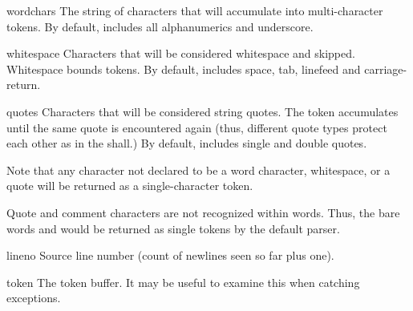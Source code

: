 \begin{memberdesc}{wordchars}
The string of characters that will accumulate into multi-character
tokens. By default, includes all \ASCII{} alphanumerics and
underscore.
\end{memberdesc}

\begin{memberdesc}{whitespace}
Characters that will be considered whitespace and skipped.  Whitespace
bounds tokens.  By default, includes space, tab, linefeed and
carriage-return.
\end{memberdesc}

\begin{memberdesc}{quotes}
Characters that will be considered string quotes.  The token
accumulates until the same quote is encountered again (thus, different
quote types protect each other as in the shall.)  By default, includes
\ASCII{} single and double quotes.
\end{memberdesc}

Note that any character not declared to be a word character,
whitespace, or a quote will be returned as a single-character token.

Quote and comment characters are not recognized within words.  Thus,
the bare words  and  would be returned as single
tokens by the default parser.

\begin{memberdesc}{lineno}
Source line number (count of newlines seen so far plus one).
\end{memberdesc}

\begin{memberdesc}{token}
The token buffer.  It may be useful to examine this when catching
exceptions.
\end{memberdesc}
